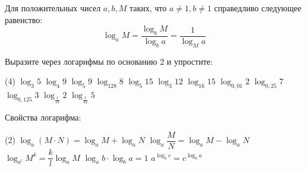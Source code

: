 \begin{class}[number=2]
	\begin{definit}
		Для положительных чисел \( a, b, M \) таких, что \( a \neq 1, b \neq 1 \) справедливо следующее равенство: \[ \log_a M = \dfrac{\log_b M}{\log_b a} = \dfrac{1}{\log_M a} \]
	\end{definit}
	\begin{listofex}
		\item Выразите через логарифмы по основанию \(2\) и упростите:
		\begin{tasks}(4)
			\task \( \log_3 5 \)
			\task \( \log_4 9 \)
			\task \( \log_5 9 \)
			\task \( \log_{128} 8 \)
			\task \( \log_5 15 \)
			\task \( \log_3 12 \)
			\task \( \log_{16} 15 \)
			\task \( \log_{0,01} 2 \)
			\task \( \log_{0,25} 7 \)
			\task \( \log_{0,125} 3 \)
			\task \( \log_{\frac{1}{16}} 2 \)
			\task \( \log_{\frac{1}{32}} 5 \)
		\end{tasks}
	\end{listofex}
	\begin{definit}
		Свойства логарифма:
		\begin{tasks}(2)
			\task \( \log_a(M \cdot N) = \log_a M + \log_a N \)
			\task \( \log_a \dfrac{M}{N} = \log_a M - \log_a N \)
			\task \( \log_{a^l} M^k=\dfrac{k}{l}\log_a M \)
			\task \( \log_a b \cdot \log_b a = 1 \)
			\task \( a^{\log_b c}=c^{\log_b a} \)
		\end{tasks}
		

\end{definit}
\end{class}
